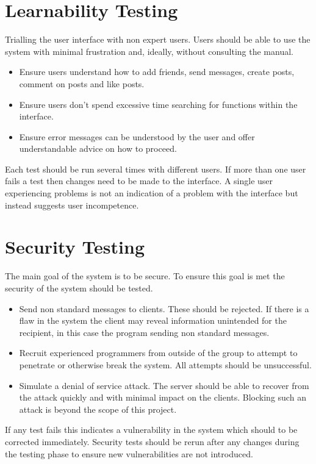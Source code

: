 \section{Learnability Testing}
Trialling the user interface with non expert users. Users should be able to use
the system with minimal frustration and, ideally, without consulting the manual.
\begin{itemize}
\item Ensure users understand how to add friends, send messages, create posts, 
comment on posts and like posts.
\item Ensure users don't spend excessive time searching for functions within the
interface.
\item Ensure error messages can be understood by the user and offer 
understandable advice on how to proceed.
\end{itemize}
Each test should be run several times with different users. If more than one 
user fails a test then changes need to be made to the interface. A single user 
experiencing problems is not an indication of a problem with the interface but 
instead suggests user incompetence.

\section{Security Testing}
The main goal of the system is to be secure. To ensure this goal is met the 
security of the system should be tested.
\begin{itemize}
\item Send non standard messages to clients. These should be rejected. If there 
is a flaw in the system the client may reveal information unintended for the 
recipient, in this case the program sending non standard messages.
\item Recruit experienced programmers from outside of the group to attempt to 
penetrate or otherwise break the system. All attempts should be unsuccessful.
\item Simulate a denial of service attack. The server should be able to recover
from the attack quickly and with minimal impact on the clients. Blocking such an
attack is beyond the scope of this project.
\end{itemize}
If any test fails this indicates a vulnerability in the system which 
should to be corrected immediately. Security tests should be rerun after any 
changes during the testing phase to ensure new vulnerabilities are not 
introduced.
